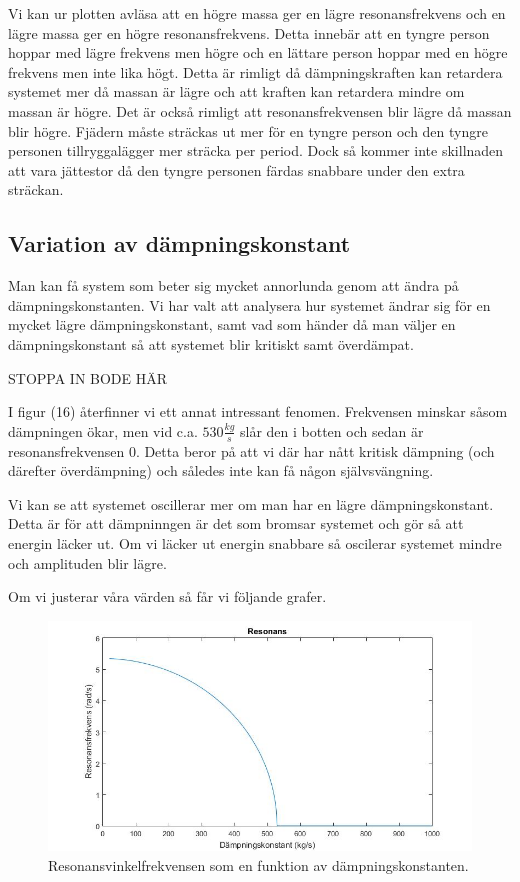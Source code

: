 \documentclass[10pt,a4paper]{article}
\begin{document}
Vi kan ur plotten avläsa att en högre massa ger en lägre resonansfrekvens och en lägre massa ger en högre resonansfrekvens. Detta innebär att en tyngre person hoppar med lägre frekvens men högre och en lättare person hoppar med en högre frekvens men inte lika högt. Detta är rimligt då dämpningskraften kan retardera systemet mer då massan är lägre och att kraften kan retardera mindre om massan är högre. Det är också rimligt att resonansfrekvensen blir lägre då massan blir högre. Fjädern måste sträckas ut mer för en tyngre person och den tyngre personen tillryggalägger mer sträcka per period. Dock så kommer inte skillnaden att vara jättestor då den tyngre personen färdas snabbare under den extra sträckan. 

\subsection{Variation av dämpningskonstant}

Man kan få system som beter sig mycket annorlunda genom att ändra på dämpningskonstanten. Vi har valt att analysera hur systemet ändrar sig för en mycket lägre dämpningskonstant, samt vad som händer då man väljer en dämpningskonstant så att systemet blir kritiskt samt överdämpat. 

STOPPA IN BODE HÄR


I figur (16) återfinner vi ett annat intressant fenomen. Frekvensen minskar såsom dämpningen ökar, men vid c.a. $530\frac{kg}{s}$ slår den i botten och sedan är resonansfrekvensen $0$. Detta beror på att vi där har nått kritisk dämpning (och därefter överdämpning) och således inte kan få någon självsvängning.
\newpage

Vi kan se att systemet oscillerar mer om man har en lägre dämpningskonstant. Detta är för att dämpninngen är det som bromsar systemet och gör så att energin läcker ut. Om vi läcker ut energin snabbare så oscilerar systemet mindre och amplituden blir lägre.

Om vi justerar våra värden så får vi följande grafer.




\begin{figure}[h]
\begin{center}
\includegraphics[scale=0.4]{resonansDamp}
\caption{Resonansvinkelfrekvensen som en funktion av dämpningskonstanten.}
\end{center}
\end{figure}
\end{document}
